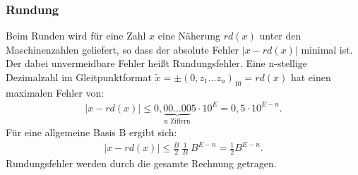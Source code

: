 \documentclass{scrartcl}
\begin{document}
\subsubsection{Rundung}
Beim Runden wird für eine Zahl $x$ eine Näherung $rd(x)$ unter den Maschinenzahlen geliefert, so dass der absolute Fehler $|x-rd(x)|$ minimal ist. Der dabei unvermeidbare Fehler heißt Rundungsfehler.
Eine n-stellige Dezimalzahl im Gleitpunktformat $\tilde{x}=\pm(0,z_1 ... z_n)_{10}=rd(x)$ hat einen maximalen Fehler von:
\begin{align*}
|x-rd(x)| \leq 0,\underbrace{00...00}_\text{n Ziffern}5 \cdot 10^E=0,5 \cdot 10^{E-n}.
\end{align*}
Für eine allgemeine Basis B ergibt sich:
\begin{align*}
|x-rd(x)|\leq \frac{B}{2} \ \frac{1}{B}  \ B^{E-n}=\frac{1}{2}B^{E-n}.
\end{align*}
Rundungsfehler werden durch die gesamte Rechnung getragen.
\end{document}
